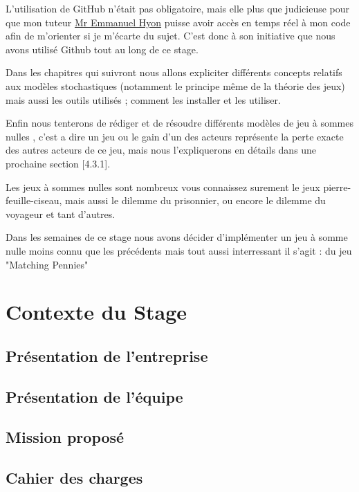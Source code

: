 \documentclass[a4paper, 12pt, twoside]{article}
\begin{document}
L'utilisation de \textsf{GitHub} n'était pas obligatoire, mais elle plus que judicieuse pour que mon tuteur \underline{\textsf{Mr Emmanuel Hyon}} puisse avoir accès en temps réel à mon code afin de m'orienter si je m'écarte du sujet. C'est donc à son initiative que nous avons utilisé \textsf{Github} tout au long de ce stage. \newline

Dans les chapitres qui suivront nous allons expliciter différents concepts relatifs aux \textsf{ modèles stochastiques} (notamment le principe même de la théorie des jeux) mais aussi les outils utilisés ; comment les installer et les utiliser. \newline

Enfin nous tenterons de rédiger et de résoudre différents modèles de \textsf{jeu à sommes nulles} , c'est a dire un jeu ou le gain d'un des acteurs représente la perte exacte des autres acteurs de ce jeu, mais nous l'expliquerons en détails dans une prochaine section [4.3.1].  \newline

Les \textsf{jeux à sommes nulles} sont nombreux vous connaissez surement le jeux \textsf{pierre-feuille-ciseau}, mais aussi le \textsf{dilemme du prisonnier}, ou encore le \textsf{dilemme du voyageur} et tant d'autres. \newline

Dans les semaines de ce stage nous avons décider d'implémenter un \textsf{jeu à somme nulle} moins connu que les précédents mais tout aussi interressant il s'agit : du jeu  \textsf{ "Matching Pennies"}

\newpage
\section{Contexte du Stage}
\subsection{Présentation de l'entreprise}
\subsection{Présentation de l'équipe}
\subsection{Mission proposé}
\subsection{Cahier des charges}
\newpage
\end{document}
